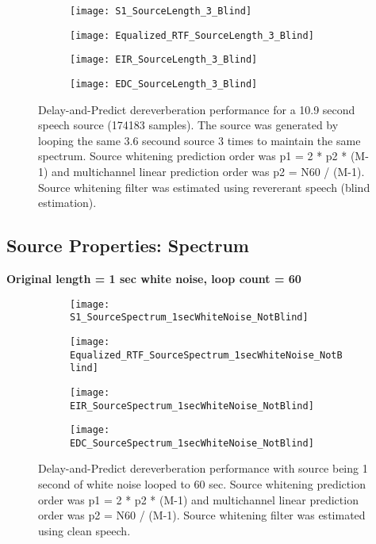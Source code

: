 \begin{figure}[H]
	\centering
	\begin{subfigure}[b]{0.49\textwidth}
		\centering
		\texttt{[image: S1\_SourceLength\_3\_Blind]}
	\end{subfigure}
	\hfill
	\begin{subfigure}[b]{0.49\textwidth}
		\centering
		\texttt{[image: Equalized\_RTF\_SourceLength\_3\_Blind]}
	\end{subfigure}
	\hfill
	\begin{subfigure}[b]{0.49\textwidth}
		\centering
		\texttt{[image: EIR\_SourceLength\_3\_Blind]}
	\end{subfigure}
	\hfill
	\begin{subfigure}[b]{0.49\textwidth}
		\centering
		\texttt{[image: EDC\_SourceLength\_3\_Blind]}
	\end{subfigure}
	\hfill
	\caption{Delay-and-Predict dereverberation performance for a 10.9 second speech source (174183 samples). The source was generated by looping the same 3.6 secound source 3 times to maintain the same spectrum. Source whitening prediction order was p1 = 2 * p2 * (M-1) and multichannel linear prediction order was p2 = N60 / (M-1). Source whitening filter was estimated using revererant speech (blind estimation).}
	\label{fig:params_source_length_3_blind}
\end{figure}

\subsection{Source Properties: Spectrum}

\textbf{Original length = 1 sec white noise, loop count = 60}

\begin{figure}[H]
	\centering
	\begin{subfigure}[b]{0.49\textwidth}
		\centering
		\texttt{[image: S1\_SourceSpectrum\_1secWhiteNoise\_NotBlind]}
	\end{subfigure}
	\hfill
	\begin{subfigure}[b]{0.49\textwidth}
		\centering
		\texttt{[image: Equalized\_RTF\_SourceSpectrum\_1secWhiteNoise\_NotBlind]}
	\end{subfigure}
	\hfill
	\begin{subfigure}[b]{0.49\textwidth}
		\centering
		\texttt{[image: EIR\_SourceSpectrum\_1secWhiteNoise\_NotBlind]}
	\end{subfigure}
	\hfill
	\begin{subfigure}[b]{0.49\textwidth}
		\centering
		\texttt{[image: EDC\_SourceSpectrum\_1secWhiteNoise\_NotBlind]}
	\end{subfigure}
	\hfill
	\caption{Delay-and-Predict dereverberation performance with source being 1 second of white noise looped to 60 sec. Source whitening prediction order was p1 = 2 * p2 * (M-1) and multichannel linear prediction order was p2 = N60 / (M-1). Source whitening filter was estimated using clean speech.}
	\label{fig:params_source_spectrum_1sec_not_blind}
\end{figure}

